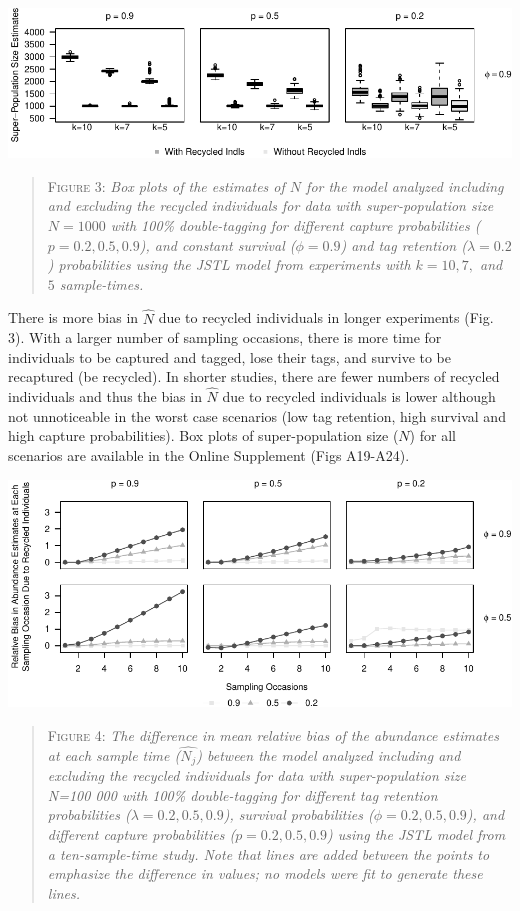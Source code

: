 \documentclass[12pt]{article}
\begin{document}
\includegraphics{RecycledPaper_files/figure-latex/Figure3_N_k-1.pdf}

\begin{quote}
\textsc{Figure 3:}
\textsl{Box plots of the estimates of $N$ for the model analyzed including and excluding the recycled individuals for data with super-population size $N=1000$ with 100\% double-tagging for different capture probabilities ($p=0.2,0.5,0.9$), and constant survival ($\phi=0.9$) and tag retention ($\lambda=0.2$) probabilities using the JSTL model from experiments with $k=10, 7,$ and $5$ sample-times. }
\end{quote}

There is more bias in \(\hat{N}\) due to recycled individuals in longer
experiments (Fig. 3). With a larger number of sampling occasions,
there is more time for individuals to be captured and tagged, lose their
tags, and survive to be recaptured (be recycled). In shorter studies,
there are fewer numbers of recycled individuals and thus the bias in
\(\hat{N}\) due to recycled individuals is lower although not
unnoticeable in the worst case scenarios (low tag retention, high
survival and high capture probabilities). Box plots of super-population
size (\(N\)) for all scenarios are available in the Online Supplement (Figs
A19-A24).

\includegraphics{RecycledPaper_files/figure-latex/Figure4_N_j-1.pdf}

\begin{quote}
\textsc{Figure 4:}
\textsl{The difference in mean relative bias of the abundance estimates at each sample time ($\hat{N_j}$) between the model analyzed including and excluding the recycled individuals for data with super-population size N=100 000 with 100\% double-tagging for different tag retention probabilities ($\lambda=0.2,0.5,0.9$), survival probabilities ($\phi=0.2,0.5,0.9$), and different capture probabilities ($p=0.2,0.5,0.9$) using the JSTL model from a ten-sample-time study.  Note that lines are added between the points to emphasize the difference in values; no models were fit to generate these lines.}
\end{quote}
\end{document}
